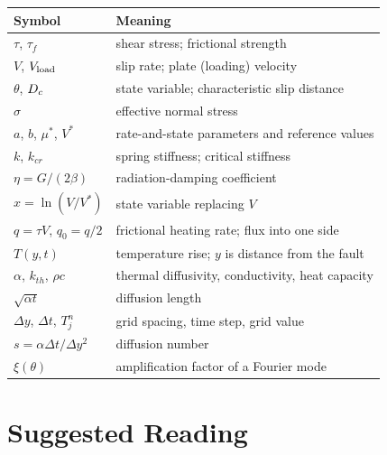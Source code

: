 \begin{center}
\small
\begin{tabular}{ll}
\toprule
Symbol & Meaning \\
\midrule
$\tau$, $\tau_f$ & shear stress; frictional strength \\
$V$, $V_{\mathrm{load}}$ & slip rate; plate (loading) velocity \\
$\theta$, $D_c$ & state variable; characteristic slip distance \\
$\sigma$ & effective normal stress \\
$a$, $b$, $\mu^*$, $V^*$ & rate-and-state parameters and reference values \\
$k$, $k_{cr}$ & spring stiffness; critical stiffness \\
$\eta=G/(2\beta)$ & radiation-damping coefficient \\
$x=\ln(V/V^*)$ & state variable replacing $V$ \\
$q=\tau V$, $q_0=q/2$ & frictional heating rate; flux into one side \\
$T(y,t)$ & temperature rise; $y$ is distance from the fault \\
$\alpha$, $k_{th}$, $\rho c$ & thermal diffusivity, conductivity, heat capacity \\
$\sqrt{\alpha t}$ & diffusion length \\
$\Delta y$, $\Delta t$, $T_j^n$ & grid spacing, time step, grid value \\
$s=\alpha\Delta t/\Delta y^2$ & diffusion number \\
$\xi(\theta)$ & amplification factor of a Fourier mode \\
\bottomrule
\end{tabular}
\end{center}

\section{Suggested Reading}
\label{sec:l3-reading}

